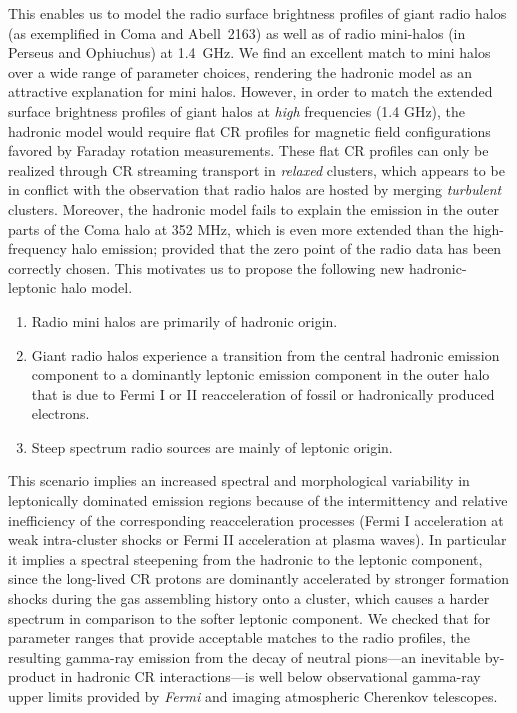 \documentclass[useAMS,usenatbib]{mn2e}
\begin{document}
This enables us to model the radio surface brightness profiles of giant radio
halos (as exemplified in Coma and Abell~2163) as well as of radio mini-halos (in
Perseus and Ophiuchus) at 1.4~GHz. We find an excellent match to mini halos over
a wide range of parameter choices, rendering the hadronic model as an attractive
explanation for mini halos. However, in order to match the extended surface
brightness profiles of giant halos at {\em high} frequencies (1.4 GHz), the
hadronic model would require flat CR profiles for magnetic field configurations
favored by Faraday rotation measurements.  These flat CR profiles can only be
realized through CR streaming transport in {\em relaxed} clusters, which appears
to be in conflict with the observation that radio halos are hosted by merging
{\em turbulent} clusters. Moreover, the hadronic model fails to explain the
emission in the outer parts of the Coma halo at 352 MHz, which is even more
extended than the high-frequency halo emission; provided that the zero point of
the radio data has been correctly chosen. This motivates us to propose the
following new hadronic-leptonic halo model.
\begin{enumerate}
\item Radio mini halos are primarily of hadronic origin.  
\item Giant radio halos experience a transition from the central hadronic
  emission component to a dominantly leptonic emission component in the outer
  halo that is due to Fermi I or II reacceleration of fossil or hadronically
  produced electrons.
\item Steep spectrum radio sources are mainly of leptonic origin.
\end{enumerate}
This scenario implies an increased spectral and morphological variability in
leptonically dominated emission regions because of the intermittency and
relative inefficiency of the corresponding reacceleration processes (Fermi I
acceleration at weak intra-cluster shocks or Fermi II acceleration at plasma
waves). In particular it implies a spectral steepening from the hadronic to the
leptonic component, since the long-lived CR protons are dominantly accelerated
by stronger formation shocks during the gas assembling history onto a cluster,
which causes a harder spectrum in comparison to the softer leptonic component.
We checked that for parameter ranges that provide acceptable matches to the
radio profiles, the resulting gamma-ray emission from the decay of neutral
pions---an inevitable by-product in hadronic CR interactions---is well below
observational gamma-ray upper limits provided by {\em Fermi} and imaging
atmospheric Cherenkov telescopes.
\end{document}
